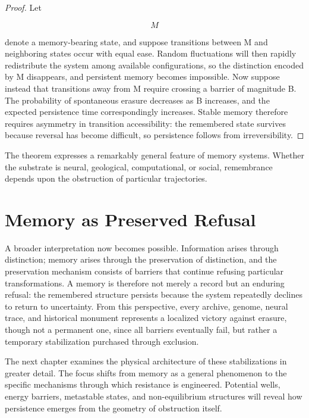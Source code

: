 \documentclass[11pt,oneside]{book}
\theoremstyle{plain}
\theoremstyle{definition}
\theoremstyle{remark}
\begin{document}
\begin{proof}
Let

\begin{equation}
M
\end{equation}

denote a memory-bearing state, and suppose transitions between M and neighboring states occur with equal ease. Random fluctuations will then rapidly redistribute the system among available configurations, so the distinction encoded by M disappears, and persistent memory becomes impossible. Now suppose instead that transitions away from M require crossing a barrier of magnitude B. The probability of spontaneous erasure decreases as B increases, and the expected persistence time correspondingly increases. Stable memory therefore requires asymmetry in transition accessibility: the remembered state survives because reversal has become difficult, so persistence follows from irreversibility.
\end{proof}

The theorem expresses a remarkably general feature of memory systems. Whether the substrate is neural, geological, computational, or social, remembrance depends upon the obstruction of particular trajectories.

\section{Memory as Preserved Refusal}

A broader interpretation now becomes possible. Information arises through distinction; memory arises through the preservation of distinction, and the preservation mechanism consists of barriers that continue refusing particular transformations. A memory is therefore not merely a record but an enduring refusal: the remembered structure persists because the system repeatedly declines to return to uncertainty. From this perspective, every archive, genome, neural trace, and historical monument represents a localized victory against erasure, though not a permanent one, since all barriers eventually fail, but rather a temporary stabilization purchased through exclusion.

The next chapter examines the physical architecture of these stabilizations in greater detail. The focus shifts from memory as a general phenomenon to the specific mechanisms through which resistance is engineered. Potential wells, energy barriers, metastable states, and non-equilibrium structures will reveal how persistence emerges from the geometry of obstruction itself.
\end{document}
